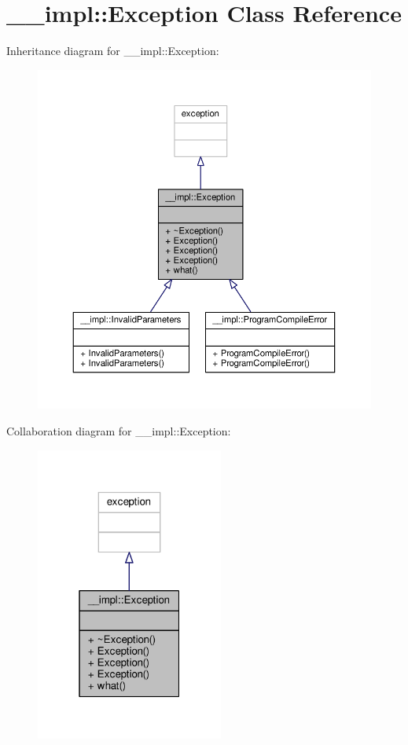 \hypertarget{class____impl_1_1Exception}{}\section{\+\_\+\+\_\+impl\+:\+:Exception Class Reference}
\label{class____impl_1_1Exception}


Inheritance diagram for \+\_\+\+\_\+impl\+:\+:Exception\+:
\nopagebreak
\begin{figure}[H]
\begin{center}
\leavevmode
\includegraphics[width=350pt]{d2/d3b/class____impl_1_1Exception__inherit__graph}
\end{center}
\end{figure}


Collaboration diagram for \+\_\+\+\_\+impl\+:\+:Exception\+:
\nopagebreak
\begin{figure}[H]
\begin{center}
\leavevmode
\includegraphics[width=175pt]{dc/db0/class____impl_1_1Exception__coll__graph}
\end{center}
\end{figure}
